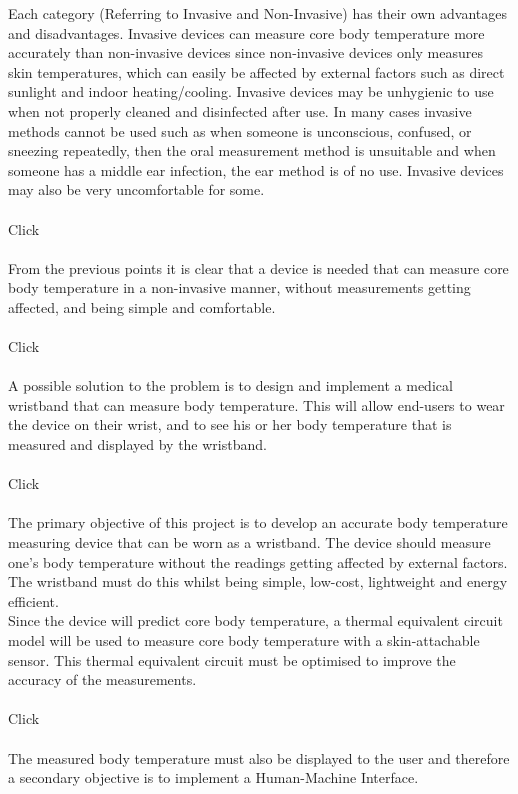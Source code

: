 \documentclass[a4paper, 12pt]{report}
\begin{document}
	Each category (Referring to Invasive and Non-Invasive) has their own advantages and disadvantages. Invasive devices can measure core body temperature more accurately than non-invasive devices since non-invasive devices only measures skin temperatures, which can easily be affected by external factors such as direct sunlight and indoor heating/cooling. Invasive devices may be unhygienic to use when not properly cleaned and disinfected after use. In many cases invasive methods cannot be used such as when someone is unconscious, confused, or sneezing repeatedly, then the oral measurement method is unsuitable and when someone has a middle ear infection, the ear method is of no use. Invasive devices may also be very uncomfortable for some. 
	\\\\
	Click
	\\\\
	From the previous points it is clear that a device is needed that can measure core body temperature in a non-invasive manner, without measurements getting affected, and being simple and comfortable. 
	\\\\
	Click
	\\\\
	A possible solution to the problem is to design and implement a medical wristband that can measure body temperature. This
	will allow end-users to wear the device on their wrist, and to see his or her body temperature that is measured and displayed by the wristband.
	\\\\
	Click
	\\\\
	
	The primary objective of this project is to develop an accurate body temperature measuring device that can be worn as a wristband. The device should measure one’s body temperature without the readings getting affected by external factors. The wristband must do this whilst being simple, low-cost, lightweight and energy efficient. 
	\\
	Since the device will predict core body temperature, a thermal equivalent circuit model will be used to measure core body temperature with a skin-attachable sensor. This thermal equivalent circuit must be optimised to improve the accuracy of the measurements.
	\\\\
	Click
	\\\\
	The measured body temperature must also be displayed to the user and therefore a secondary objective is to implement a Human-Machine Interface. 
	
\end{document}
